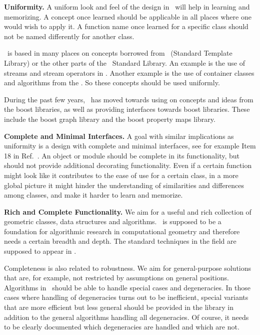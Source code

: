 {\bf Uniformity.}
A uniform look and feel of the design in \cgal\ will help in learning
and memorizing. A concept once learned should be applicable in all
places where one would wish to apply it. 
A function name once learned for a specific
class should not be named differently for another class. 

 \ccIndexMainItem{\stl} \cgal\ is
based in many places on concepts borrowed from \stl\ (Standard
Template Library) or the other parts of the \CC\ Standard Library. An
example is the use of streams and stream operators in \cgal. Another
example is the use of container classes and algorithms from the
\stl. So these concepts should be used uniformly.

  During the past few years,
\cgal\ has moved towards using on concepts and ideas from the boost
libraries, as well as providing interfaces towards boost
libraries. These include the boost graph library and the boost property
maps library.

{\bf Complete and Minimal Interfaces.}
A goal with similar implications as uniformity is a design
with complete and minimal interfaces, see for example Item 18 
in Ref.~\cite{cgal:m-ec-97}.
An object or module should be complete in its 
functionality, but should
not provide additional decorating functionality. Even if a certain
function might look like it contributes to the ease of use for a certain 
class, in a more global picture it might hinder the understanding of 
similarities and differences among classes, and make it harder to learn 
and memorize.

{\bf Rich and Complete Functionality.}
We aim for a useful and rich collection of geometric classes, data
structures and algorithms. \cgal\ is supposed to be a foundation for
algorithmic research in computational geometry and therefore needs a
certain breadth and depth. The standard techniques in the field are
supposed to appear in \cgal. 

Completeness is also related to robustness.
We aim for general-purpose
solutions that are, for example, not restricted by assumptions on
general positions. Algorithms in \cgal\ should be able to handle
special cases and degeneracies. 
In those cases where handling of degeneracies turns out to be
inefficient, special variants that are more efficient but less general
should be provided in the library in addition to the general 
algorithms handling all degeneracies. Of course, it needs to be
clearly documented which degeneracies are handled and which are not.

